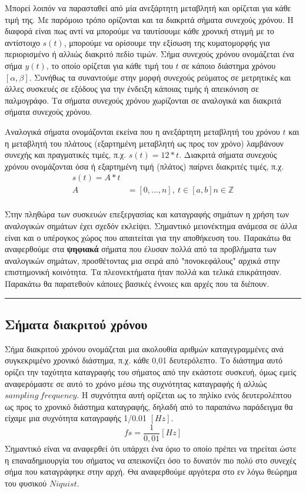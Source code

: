 \documentclass[breaklines=true, 12pt]{article}
\begin{document}
Μπορεί λοιπόν να παρασταθεί από μία ανεξάρτητη μεταβλητή και ορίζεται για κάθε
τιμή της. Με παρόμοιο τρόπο ορίζονται και τα διακριτά σήματα συνεχούς χρόνου.
Η διαφορά είναι πως αντί να μπορούμε να ταυτίσουμε κάθε χρονική στιγμή με το
αντίστοιχο \(s(t)\), μπορούμε να ορίσουμε την εξίσωση της κυματομορφής για
περιορισμένο ή αλλιώς διακριτό πεδίο τιμών. Σήμα συνεχούς χρόνου
ονομάζεται ένα σήμα \(y(t)\), το οποίο ορίζεται για κάθε τιμή του \(t\) σε κάποιο
διάστημα χρόνου \([\alpha,\beta]\). Συνήθως τα συναντούμε στην μορφή συνεχούς ρεύματος σε
μετρητικές και άλλες συσκευές σε εξόδους για την ένδειξη κάποιας τιμής ή
απεικόνιση σε παλμογράφο. Τα σήματα συνεχούς χρόνου χωρίζονται σε αναλογικά
και διακριτά σήματα συνεχούς χρόνου.

Αναλογικά σήματα ονομάζονται εκείνα που η ανεξάρτητη μεταβλητή του
χρόνου \(t\) και η μεταβλητή του πλάτους (εξαρτημένη μεταβλητή ως προς τον
χρόνο) λαμβάνουν συνεχής και πραγματικές τιμές, π.χ. \(s(t) = 12 * t\).
Διακριτά σήματα συνεχούς χρόνου ονομάζονται όσα ή εξαρτημένη τιμή
(πλάτος) παίρνει διακριτές τιμές, π.χ.
\begin{equation}
\begin{align}
s(t) =  A * t \\
A &= [0, … ,n],\ t \in [a,b] n \in \mathbb{Z} \\
\end{align}
\end{equation}

Στην πληθώρα των συσκευών επεξεργασίας και καταγραφής σημάτων η χρήση
των αναλογικών σημάτων έχει σχεδόν εκλείψει. Σημαντικό μειονέκτημα
ανάμεσα σε άλλα είναι και ο υπέρογκος χώρος που απαιτείται
για την αποθήκευση του. Παρακάτω θα αναφερθούμε στα \textbf{ψηφιακά} σήματα που
έλυσαν πολλά από τα προβλήματα των αναλογικών σημάτων, προσθέτοντας μια
σειρά από "πονοκεφάλους" αρχικά στην επιστημονική κοινότητα. Τα
πλεονεκτήματα ήταν πολλά και τελικά επικράτησαν. Παρακάτω θα παρατεθούν
κάποιες βασικές έννοιες και αρχές που τα διέπουν.

\noindent\rule{\textwidth}{0.5pt}
\subsection{Σήματα διακριτού χρόνου}
\label{sec:org27ba2e5}
Σήμα διακριτού χρόνου ονομάζεται μια ακολουθία αριθμών καταγεγραμμένες
ανά συγκεκριμένο χρονικό διάστημα, π.χ. κάθε 0,01 δευτερόλεπτο. Το
διάστημα αυτό ορίζει την ταχύτητα καταγραφής του σήματος από την
εκάστοτε συσκευή, όμως εμείς αναφερόμαστε σε αυτό το χρόνο μέσω της
συχνότητας καταγραφής ή αλλιώς \({sampling\ frequency}\). Η συχνότητα αυτή
ορίζεται ως το πηλίκο ενός δευτερολέπτου ως προς το χρονικό διάστημα
καταγραφής, δηλαδή από το παραπάνω παράδειγμα θα είχαμε μια συχνότητα
καταγραφής 1/0.01 \([Hz]\).
\begin{equation}
fs = \frac{1}{0,01} [Hz]
\end{equation}
Σημαντικό είναι να αναφερθεί ότι υπάρχει ένα όριο το οποίο πρέπει να
τηρείται ώστε η επαναδημιουργία του σήματος να απεικονίζει όσο το
δυνατόν πιο πολύ στο συνεχές σήμα που καταγράφηκε στην αρχή. Θα
αναφερθούμε αργότερα στο εν λόγω θεώρημα του φυσικού \({Niquist}\).
\end{document}
